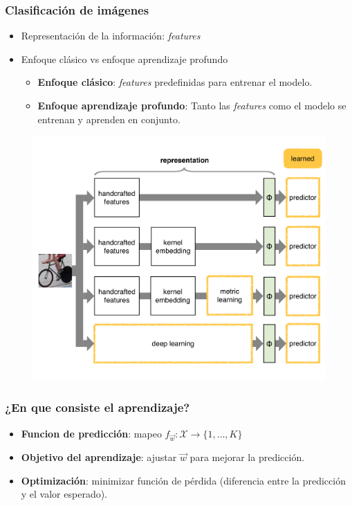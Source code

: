 \documentclass[10pt,center]{beamer}
\begin{document}
\begin{frame}
  \frametitle{Clasificación de imágenes}
  \begin{itemize}
    \item Representación de la información: \textit{features}
    \item Enfoque clásico vs enfoque aprendizaje profundo
    \begin{itemize}
      \item \textbf{Enfoque clásico}: \textit{features} predefinidas para entrenar el modelo.
      \item \textbf{Enfoque aprendizaje profundo}: Tanto las \textit{features} como el modelo se entrenan y aprenden en conjunto.
    \end{itemize}
  \end{itemize}
  \begin{figure}[h]
  \captionsetup[subfigure]{labelformat=empty}
    \begin{center}
	    \includegraphics[height=0.6\textheight]{./img/vedaldi_shallow_deep.pdf}
    \end{center}
  \end{figure}
\end{frame}

\begin{frame}
  \frametitle{¿En que consiste el aprendizaje?}
  \begin{itemize}
    \item \textbf{Funcion de predicción}: mapeo $f_{\overrightarrow{w}}: \mathcal{X} {\rightarrow} \{1,\dots,K\}$
    \item \textbf{Objetivo del aprendizaje}: ajustar $\overrightarrow{w}$ para mejorar la predicción.
    \item \textbf{Optimización}: minimizar función de pérdida (diferencia entre la predicción y el valor esperado).
  \end{itemize}
\end{frame}
\end{document}
